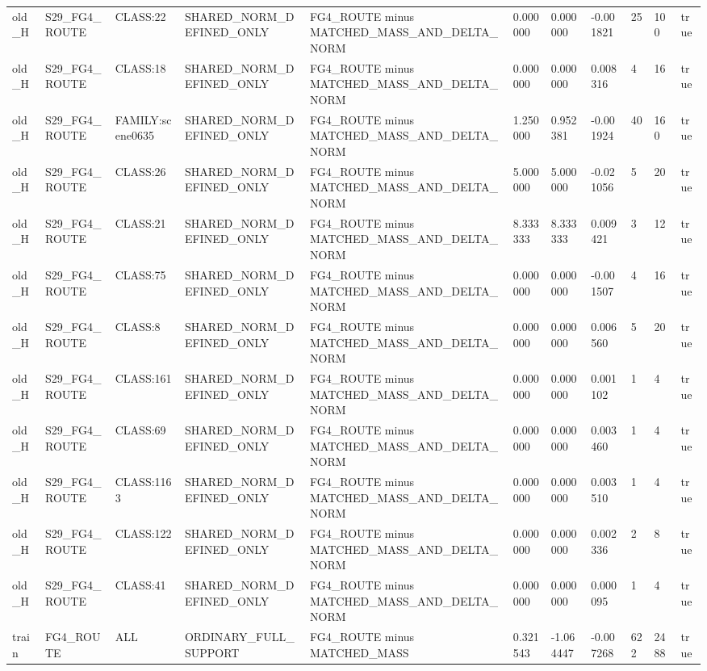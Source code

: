 \begin{tabular}{lllllllllll}
old\_H & S29\_FG4\_ROUTE & CLASS:22 & SHARED\_NORM\_DEFINED\_ONLY & FG4\_ROUTE minus MATCHED\_MASS\_AND\_DELTA\_NORM & 0.000000 & 0.000000 & -0.001821 & 25 & 100 & true \\
old\_H & S29\_FG4\_ROUTE & CLASS:18 & SHARED\_NORM\_DEFINED\_ONLY & FG4\_ROUTE minus MATCHED\_MASS\_AND\_DELTA\_NORM & 0.000000 & 0.000000 & 0.008316 & 4 & 16 & true \\
old\_H & S29\_FG4\_ROUTE & FAMILY:scene0635 & SHARED\_NORM\_DEFINED\_ONLY & FG4\_ROUTE minus MATCHED\_MASS\_AND\_DELTA\_NORM & 1.250000 & 0.952381 & -0.001924 & 40 & 160 & true \\
old\_H & S29\_FG4\_ROUTE & CLASS:26 & SHARED\_NORM\_DEFINED\_ONLY & FG4\_ROUTE minus MATCHED\_MASS\_AND\_DELTA\_NORM & 5.000000 & 5.000000 & -0.021056 & 5 & 20 & true \\
old\_H & S29\_FG4\_ROUTE & CLASS:21 & SHARED\_NORM\_DEFINED\_ONLY & FG4\_ROUTE minus MATCHED\_MASS\_AND\_DELTA\_NORM & 8.333333 & 8.333333 & 0.009421 & 3 & 12 & true \\
old\_H & S29\_FG4\_ROUTE & CLASS:75 & SHARED\_NORM\_DEFINED\_ONLY & FG4\_ROUTE minus MATCHED\_MASS\_AND\_DELTA\_NORM & 0.000000 & 0.000000 & -0.001507 & 4 & 16 & true \\
old\_H & S29\_FG4\_ROUTE & CLASS:8 & SHARED\_NORM\_DEFINED\_ONLY & FG4\_ROUTE minus MATCHED\_MASS\_AND\_DELTA\_NORM & 0.000000 & 0.000000 & 0.006560 & 5 & 20 & true \\
old\_H & S29\_FG4\_ROUTE & CLASS:161 & SHARED\_NORM\_DEFINED\_ONLY & FG4\_ROUTE minus MATCHED\_MASS\_AND\_DELTA\_NORM & 0.000000 & 0.000000 & 0.001102 & 1 & 4 & true \\
old\_H & S29\_FG4\_ROUTE & CLASS:69 & SHARED\_NORM\_DEFINED\_ONLY & FG4\_ROUTE minus MATCHED\_MASS\_AND\_DELTA\_NORM & 0.000000 & 0.000000 & 0.003460 & 1 & 4 & true \\
old\_H & S29\_FG4\_ROUTE & CLASS:1163 & SHARED\_NORM\_DEFINED\_ONLY & FG4\_ROUTE minus MATCHED\_MASS\_AND\_DELTA\_NORM & 0.000000 & 0.000000 & 0.003510 & 1 & 4 & true \\
old\_H & S29\_FG4\_ROUTE & CLASS:122 & SHARED\_NORM\_DEFINED\_ONLY & FG4\_ROUTE minus MATCHED\_MASS\_AND\_DELTA\_NORM & 0.000000 & 0.000000 & 0.002336 & 2 & 8 & true \\
old\_H & S29\_FG4\_ROUTE & CLASS:41 & SHARED\_NORM\_DEFINED\_ONLY & FG4\_ROUTE minus MATCHED\_MASS\_AND\_DELTA\_NORM & 0.000000 & 0.000000 & 0.000095 & 1 & 4 & true \\
train & FG4\_ROUTE & ALL & ORDINARY\_FULL\_SUPPORT & FG4\_ROUTE minus MATCHED\_MASS & 0.321543 & -1.064447 & -0.007268 & 622 & 2488 & true \\

\end{tabular}
